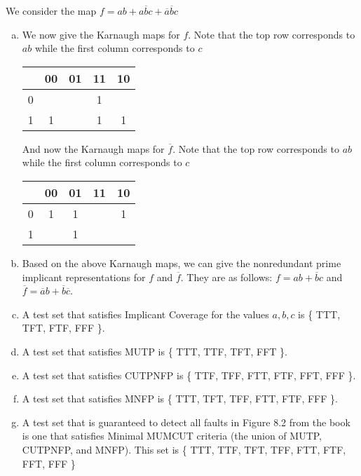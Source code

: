 \documentclass{article}
\newcommand{\nota}{\overline{a}}
\newcommand{\notb}{\overline{b}}
\newcommand{\notc}{\overline{c}}
\newcommand{\fbar}{\overline{f}}
\begin{document}
We consider the map $ f = ab + a \notb c + \nota \notb c $
\begin{enumerate}[(a)]
	\item We now give the Karnaugh maps for $f$. Note that the top row corresponds to $ab$ while the first column corresponds to $c$
	\begin{center}
		\begin{tabular}{c||c|c|c|c|}
			& 00 & 01 & 11 & 10 \\
			\hline
			0 & & & 1 & \\
			\hline
			1 & 1 & & 1 & 1 \\
			\hline
		\end{tabular}
	\end{center}
	And now the Karnaugh maps for $\fbar$. Note that the top row corresponds to $ab$ while the first column corresponds to $c$
	\begin{center}
		\begin{tabular}{c||c|c|c|c|}
			& 00 & 01 & 11 & 10 \\
			\hline
			0 & 1 & 1 & & 1 \\
			\hline
			1 & & 1 & & \\
			\hline
		\end{tabular}
	\end{center}
	\item Based on the above Karnaugh maps, we can give the nonredundant prime implicant representations for $f$ and $\fbar$. They are as follows: $ f = ab + \notb c $ and $ \fbar = \nota b + \notb \notc $.
	\item A test set that satisfies Implicant Coverage for the values $a,b,c$ is \{ TTT, TFT, FTF, FFF \}.
	\item A test set that satisfies MUTP is \{ TTT, TTF, TFT, FFT \}.
	\item A test set that satisfies CUTPNFP is \{ TTF, TFF, FTT, FTF, FFT, FFF \}.
	\item A test set that satisfies MNFP is \{ TTT, TFT, TFF, FTT, FTF, FFF \}.
	\item A test set that is guaranteed to detect all faults in Figure 8.2 from the book is one that satisfies Minimal MUMCUT criteria (the union of MUTP, CUTPNFP, and MNFP). This set is \{ TTT, TTF, TFT, TFF, FTT, FTF, FFT, FFF \}
\end{enumerate}
\end{document}
